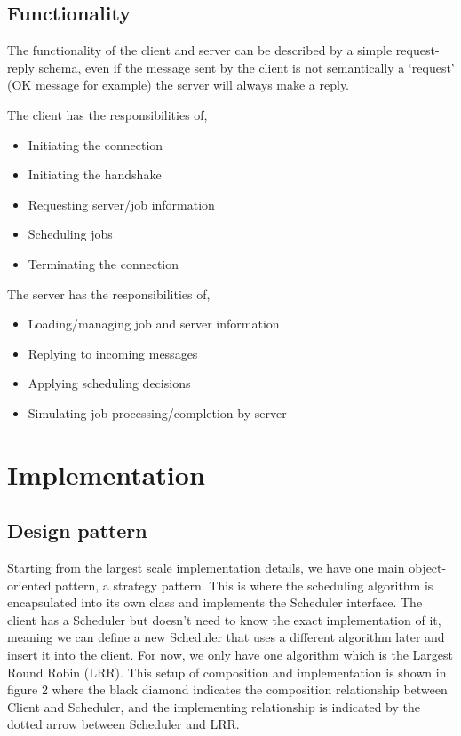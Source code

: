 \documentclass[a4paper]{article} %
\begin{document}
\subsection{Functionality}
The functionality of the client and server can be described by a simple request-reply schema, even if the message sent by the client is not semantically a ‘request’ (OK message for example) the server will always make a reply.\par
The client has the responsibilities of,
\begin{itemize}
    \item Initiating the connection
    \item Initiating the handshake
    \item Requesting server/job information
    \item Scheduling jobs
    \item Terminating the connection
\end{itemize}

The server has the responsibilities of,
\begin{itemize}
    \item Loading/managing job and server information
    \item Replying to incoming messages
    \item Applying scheduling decisions
    \item Simulating job processing/completion by server 
\end{itemize}

\section{Implementation}
\subsection{Design pattern}
Starting from the largest scale implementation details, we have one main object-oriented pattern, a strategy pattern. This is where the scheduling algorithm is encapsulated into its own class and implements the Scheduler interface. The client has a Scheduler but doesn’t need to know the exact implementation of it, meaning we can define a new Scheduler that uses a different algorithm later and insert it into the client. For now, we only have one algorithm which is the Largest Round Robin (LRR). This setup of composition and implementation is shown in figure 2 where the black diamond indicates the composition relationship between Client and Scheduler, and the implementing relationship is indicated by the dotted arrow between Scheduler and LRR.
\end{document}
